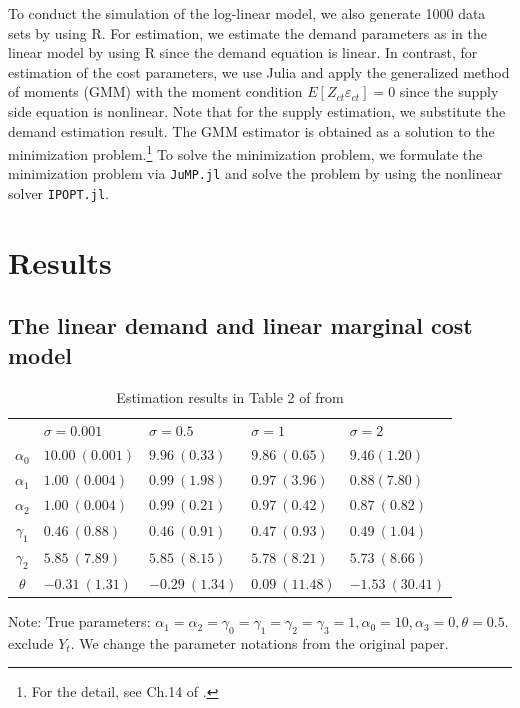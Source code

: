\documentclass[11pt, a4paper]{article}
\begin{document}
To conduct the simulation of the log-linear model, we also generate 1000 data sets by using R. 
For estimation, we estimate the demand parameters as in the linear model by using R since the demand equation is linear.
In contrast, for estimation of the cost parameters, we use Julia and apply the generalized method of moments (GMM) with the moment condition $E[Z_{ct} \varepsilon_{ct}] = 0$ since the supply side equation is nonlinear.
Note that for the supply estimation, we substitute the demand estimation result.
The GMM estimator is obtained as a solution to the minimization problem.\footnote{For the detail, see Ch.14 of \citet{wooldridge2010econometric}.}
To solve the minimization problem, we formulate the minimization problem via \texttt{JuMP.jl} and solve the problem by using the nonlinear solver \texttt{IPOPT.jl}.



\section{Results}

\subsection{The linear demand and linear marginal cost model}

\begin{table}[!htbp]
    \caption{Estimation results in Table 2 of from \cite{perloff2012collinearity}}
    \label{tb:linear_linear_sigma_Perloff_Shen}
    \begin{center}
        \begin{tabular}{cllll}
            \hline
            & $\sigma=0.001$ & $\sigma=0.5$ & $\sigma=1$ & $\sigma=2$ \\
            $\alpha_0$ & $10.00\ (0.001)$ & $9.96\ (0.33)$ & $9.86\ (0.65)$ & $9.46(1.20)$ \\
            $\alpha_1$ & $1.00\ (0.004)$ & $0.99\ (1.98)$ & $0.97\ (3.96)$ & $0.88(7.80)$ \\
            $\alpha_2$ & $1.00\ (0.004)$ & $0.99\ (0.21)$ & $0.97\ (0.42)$ & $0.87\ (0.82)$ \\
            $\gamma_1$ & $0.46\ (0.88)$ & $0.46\ (0.91)$ & $0.47\ (0.93)$ & $0.49\ (1.04)$ \\
            $\gamma_2$ & $5.85\ (7.89)$ & $5.85\ (8.15)$ & $5.78\ (8.21)$ & $5.73\ (8.66)$ \\
            $\theta$ & $-0.31\ (1.31)$ & $-0.29\ (1.34)$ & $0.09\ (11.48)$ & $-1.53\ (30.41)$ \\
            \hline
        \end{tabular}
    \end{center}\footnotesize
    Note: True parameters: $\alpha_1 = \alpha_2 = \gamma_0 = \gamma_1 = \gamma_2  = \gamma_3 = 1, \alpha_0 = 10, \alpha_3 = 0,  \theta = 0.5$. \citet{perloff2012collinearity} exclude $Y_t$. We change the parameter notations from the original paper.
\end{table}
\end{document}
